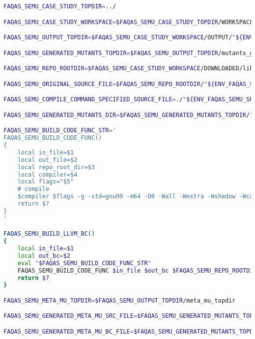 \begin{lstlisting}[language=bash,label=listing:LIBUTIL:conf,caption=faqas\_semus\_conf.sh file for LIBUTIL case study.]
FAQAS_SEMU_CASE_STUDY_TOPDIR=../

FAQAS_SEMU_CASE_STUDY_WORKSPACE=$FAQAS_SEMU_CASE_STUDY_TOPDIR/WORKSPACE

FAQAS_SEMU_OUTPUT_TOPDIR=$FAQAS_SEMU_CASE_STUDY_WORKSPACE/OUTPUT/"${ENV_FAQAS_SEMU_SRC_FILE%.c}"

FAQAS_SEMU_GENERATED_MUTANTS_TOPDIR=$FAQAS_SEMU_OUTPUT_TOPDIR/mutants_generation

FAQAS_SEMU_REPO_ROOTDIR=$FAQAS_SEMU_CASE_STUDY_WORKSPACE/DOWNLOADED/libutil

FAQAS_SEMU_ORIGINAL_SOURCE_FILE=$FAQAS_SEMU_REPO_ROOTDIR/"${ENV_FAQAS_SEMU_SRC_FILE}"

FAQAS_SEMU_COMPILE_COMMAND_SPECIFIED_SOURCE_FILE=./"${ENV_FAQAS_SEMU_SRC_FILE}"

FAQAS_SEMU_GENERATED_MUTANTS_DIR=$FAQAS_SEMU_GENERATED_MUTANTS_TOPDIR/"${ENV_FAQAS_SEMU_SRC_FILE%.c}"

FAQAS_SEMU_BUILD_CODE_FUNC_STR='
FAQAS_SEMU_BUILD_CODE_FUNC()
{
    local in_file=$1
    local out_file=$2
    local repo_root_dir=$3
    local compiler=$4
    local flags="$5"
    # compile
    $compiler $flags -g -std=gnu99 -m64 -O0 -Wall -Wextra -Wshadow -Wcast-align -Wwrite-strings -Wno-unused-parameter -I$repo_root_dir/src -I$repo_root_dir/src/gosh -I$repo_root_dir/src/zip -I$repo_root_dir/src/watchdog  -I$repo_root_dir/build/src/watchdog -I$repo_root_dir/build/src -I$repo_root_dir/include -I$repo_root_dir/build/include -I$repo_root_dir/include/gs -I$repo_root_dir/build/include/gs -I$repo_root_dir/include/deprecated -I$repo_root_dir/build/include/deprecated -I$repo_root_dir/include/deprecated/gs/gosh -I$repo_root_dir/build/include/deprecated/gs/gosh -I$repo_root_dir/include -o $out_file $in_file $flags
    return $?
}
'

FAQAS_SEMU_BUILD_LLVM_BC()
{
    local in_file=$1
    local out_bc=$2
    eval "$FAQAS_SEMU_BUILD_CODE_FUNC_STR"
    FAQAS_SEMU_BUILD_CODE_FUNC $in_file $out_bc $FAQAS_SEMU_REPO_ROOTDIR clang '-c -emit-llvm'
    return $?
}

FAQAS_SEMU_META_MU_TOPDIR=$FAQAS_SEMU_OUTPUT_TOPDIR/meta_mu_topdir

FAQAS_SEMU_GENERATED_META_MU_SRC_FILE=$FAQAS_SEMU_GENERATED_MUTANTS_TOPDIR/"${ENV_FAQAS_SEMU_SRC_FILE%.c}".MetaMu.c

FAQAS_SEMU_GENERATED_META_MU_BC_FILE=$FAQAS_SEMU_GENERATED_MUTANTS_TOPDIR/"${ENV_FAQAS_SEMU_SRC_FILE%.c}".MetaMu.bc


\end{lstlisting}

